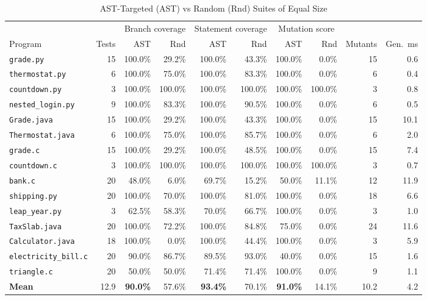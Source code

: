\documentclass[conference]{IEEEtran}
\begin{document}
\begin{table}[t]
\caption{AST-Targeted (AST) vs Random (Rnd) Suites of Equal Size}\label{tab:results}
\centering\footnotesize
\begin{tabular}{@{}lrrrrrrrrr@{}}
\toprule
 & & \multicolumn{2}{c}{Branch coverage} & \multicolumn{2}{c}{Statement coverage} & \multicolumn{2}{c}{Mutation score} & & \\
\cmidrule(lr){3-4}\cmidrule(lr){5-6}\cmidrule(lr){7-8}
Program & Tests & AST & Rnd & AST & Rnd & AST & Rnd & Mutants & Gen.\ ms \\
\midrule
\texttt{grade.py} & 15 & 100.0\% & 29.2\% & 100.0\% & 43.3\% & 100.0\% & 0.0\% & 15 & 0.6 \\
\texttt{thermostat.py} & 6 & 100.0\% & 75.0\% & 100.0\% & 83.3\% & 100.0\% & 0.0\% & 6 & 0.4 \\
\texttt{countdown.py} & 3 & 100.0\% & 100.0\% & 100.0\% & 100.0\% & 100.0\% & 100.0\% & 3 & 0.8 \\
\texttt{nested\_login.py} & 9 & 100.0\% & 83.3\% & 100.0\% & 90.5\% & 100.0\% & 0.0\% & 6 & 0.5 \\
\texttt{Grade.java} & 15 & 100.0\% & 29.2\% & 100.0\% & 43.3\% & 100.0\% & 0.0\% & 15 & 10.1 \\
\texttt{Thermostat.java} & 6 & 100.0\% & 75.0\% & 100.0\% & 85.7\% & 100.0\% & 0.0\% & 6 & 2.0 \\
\texttt{grade.c} & 15 & 100.0\% & 29.2\% & 100.0\% & 48.5\% & 100.0\% & 0.0\% & 15 & 7.4 \\
\texttt{countdown.c} & 3 & 100.0\% & 100.0\% & 100.0\% & 100.0\% & 100.0\% & 100.0\% & 3 & 0.7 \\
\texttt{bank.c} & 20 & 48.0\% & 6.0\% & 69.7\% & 15.2\% & 50.0\% & 11.1\% & 12 & 11.9 \\
\texttt{shipping.py} & 20 & 100.0\% & 70.0\% & 100.0\% & 81.0\% & 100.0\% & 0.0\% & 18 & 6.6 \\
\texttt{leap\_year.py} & 3 & 62.5\% & 58.3\% & 70.0\% & 66.7\% & 100.0\% & 0.0\% & 3 & 1.0 \\
\texttt{TaxSlab.java} & 20 & 100.0\% & 72.2\% & 100.0\% & 84.8\% & 75.0\% & 0.0\% & 24 & 11.6 \\
\texttt{Calculator.java} & 18 & 100.0\% & 0.0\% & 100.0\% & 44.4\% & 100.0\% & 0.0\% & 3 & 5.9 \\
\texttt{electricity\_bill.c} & 20 & 90.0\% & 86.7\% & 89.5\% & 93.0\% & 40.0\% & 0.0\% & 15 & 1.6 \\
\texttt{triangle.c} & 20 & 50.0\% & 50.0\% & 71.4\% & 71.4\% & 100.0\% & 0.0\% & 9 & 1.1 \\
\midrule
\textbf{Mean} & 12.9 & \textbf{90.0\%} & 57.6\% & \textbf{93.4\%} & 70.1\% & \textbf{91.0\%} & 14.1\% & 10.2 & 4.2 \\
\bottomrule
\end{tabular}
\end{table}
\end{document}
